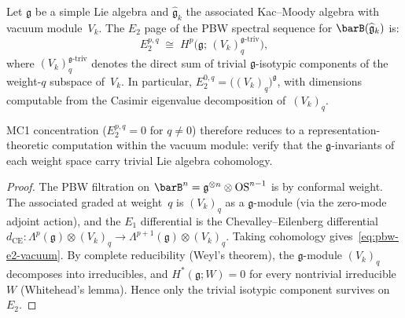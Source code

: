 \begin{proposition}\label{prop:pbw-e2-from-vacuum-module}
Let $\mathfrak{g}$ be a simple Lie algebra and
$\widehat{\mathfrak{g}}_k$ the associated Kac--Moody algebra
with vacuum module~$V_k$.
The $E_2$ page of the PBW spectral sequence for
$\barB(\widehat{\mathfrak{g}}_k)$ is:
\begin{equation}\label{eq:pbw-e2-vacuum}
E_2^{p,q}
\;\cong\;
H^p\!\bigl(\mathfrak{g};\,
(V_k)_q^{\mathfrak{g}\text{-}\mathrm{triv}}\bigr),
\end{equation}
where $(V_k)_q^{\mathfrak{g}\text{-}\mathrm{triv}}$
denotes the direct sum of trivial $\mathfrak{g}$-isotypic
components of the weight-$q$ subspace of~$V_k$.
In particular, $E_2^{0,q} =
\bigl((V_k)_q\bigr)^{\mathfrak{g}}$, with dimensions
computable from the Casimir eigenvalue decomposition
of~$(V_k)_q$.

MC1 concentration ($E_2^{p,q} = 0$ for $q \neq 0$) therefore
reduces to a representation-theoretic computation within the
vacuum module: verify that the $\mathfrak{g}$-invariants of each
weight space carry trivial Lie algebra cohomology.
\end{proposition}

\begin{proof}
The PBW filtration on
$\barB^n = \mathfrak{g}^{\otimes n} \otimes \mathrm{OS}^{n-1}$
is by conformal weight.  The associated graded at weight~$q$ is
$(V_k)_q$ as a $\mathfrak{g}$-module (via the zero-mode adjoint
action), and the $E_1$ differential is the Chevalley--Eilenberg
differential $d_{\mathrm{CE}} \colon
\Lambda^p(\mathfrak{g}) \otimes (V_k)_q \to
\Lambda^{p+1}(\mathfrak{g}) \otimes (V_k)_q$.
Taking cohomology gives~\eqref{eq:pbw-e2-vacuum}.
By complete reducibility (Weyl's theorem), the $\mathfrak{g}$-module
$(V_k)_q$ decomposes into irreducibles, and
$H^*(\mathfrak{g}; W) = 0$ for every nontrivial irreducible~$W$
(Whitehead's lemma).  Hence only the trivial isotypic component
survives on~$E_2$.
\end{proof}

